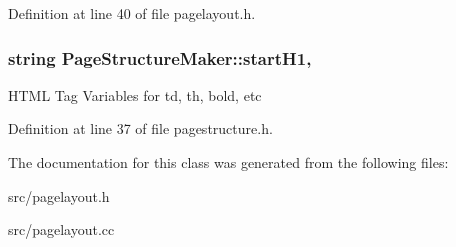 Definition at line 40 of file pagelayout.\-h.

\hypertarget{classPageStructureMaker_af41d4e21b808f5f8dc2c727f775b6fb2}{
\subsubsection[{start\-H1}]{\setlength{\rightskip}{0pt plus 5cm}string Page\-Structure\-Maker\-::start\-H1\hspace{0.3cm}{\ttfamily [protected]}, {\ttfamily [inherited]}}}\label{classPageStructureMaker_af41d4e21b808f5f8dc2c727f775b6fb2}
H\-T\-M\-L Tag Variables for td, th, bold, etc 

Definition at line 37 of file pagestructure.\-h.



The documentation for this class was generated from the following files\-:\begin{DoxyCompactItemize}
\item 
src/pagelayout.\-h\item 
src/pagelayout.\-cc\end{DoxyCompactItemize}
